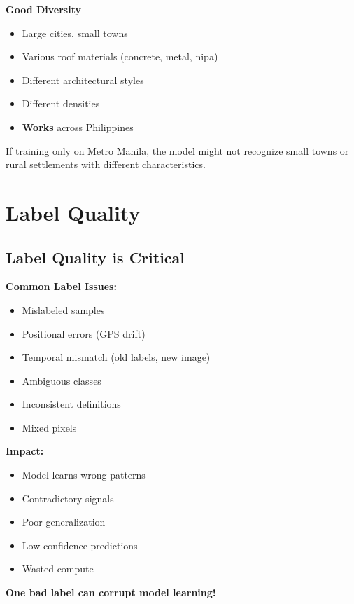 \documentclass[
  letterpaper,
  DIV=11,
  numbers=noendperiod]{scrartcl}
\providecommand{\tightlist}{%
  \setlength{\itemsep}{0pt}\setlength{\parskip}{0pt}}
\begin{document}
\textbf{Good Diversity}

\begin{itemize}
\tightlist
\item
  Large cities, small towns
\item
  Various roof materials (concrete, metal, nipa)
\item
  Different architectural styles
\item
  Different densities
\item
  \textbf{Works} across Philippines
\end{itemize}

If training only on Metro Manila, the model might not recognize small
towns or rural settlements with different characteristics.

\section{Label Quality}\label{label-quality}

\subsection{Label Quality is Critical}\label{label-quality-is-critical}

\textbf{Common Label Issues:}

\begin{itemize}
\tightlist
\item
  Mislabeled samples
\item
  Positional errors (GPS drift)
\item
  Temporal mismatch (old labels, new image)
\item
  Ambiguous classes
\item
  Inconsistent definitions
\item
  Mixed pixels
\end{itemize}

\textbf{Impact:}

\begin{itemize}
\tightlist
\item
  Model learns wrong patterns
\item
  Contradictory signals
\item
  Poor generalization
\item
  Low confidence predictions
\item
  Wasted compute
\end{itemize}

\textbf{One bad label can corrupt model learning!}
\end{document}
